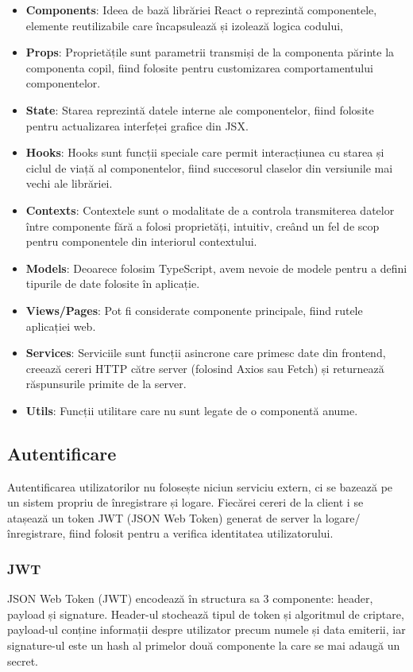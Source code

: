 \begin{itemize}
    \item \textbf{Components}: Ideea de bază librăriei React o reprezintă componentele, elemente
    reutilizabile care încapsulează și izolează logica codului,
    \item \textbf{Props}: Proprietățile sunt parametrii transmiși de la componenta părinte
    la componenta copil, fiind folosite pentru customizarea comportamentului componentelor.
    \item \textbf{State}: Starea reprezintă datele interne ale componentelor, fiind folosite pentru
    actualizarea interfeței grafice din JSX.
    \item \textbf{Hooks}: Hooks sunt funcții speciale care permit interacțiunea cu starea și ciclul
    de viață al componentelor, fiind succesorul claselor din versiunile mai vechi ale librăriei.
    \item \textbf{Contexts}: Contextele sunt o modalitate de a controla transmiterea datelor între
    componente fără a folosi proprietăți, intuitiv, creând un fel de scop pentru componentele din
    interiorul contextului.
    \item \textbf{Models}: Deoarece folosim TypeScript, avem nevoie de modele pentru a defini tipurile
    de date folosite în aplicație.
    \item \textbf{Views/Pages}: Pot fi considerate componente principale, fiind rutele aplicației web.
    \item \textbf{Services}: Serviciile sunt funcții asincrone care primesc date din frontend,
    creează cereri HTTP către server (folosind Axios sau Fetch) și returnează răspunsurile
    primite de la server.
    \item \textbf{Utils}: Funcții utilitare care nu sunt legate de o componentă anume.
\end{itemize}

\subsection{Autentificare}
Autentificarea utilizatorilor nu folosește niciun serviciu extern, ci se bazează pe un sistem
propriu de înregistrare și logare. Fiecărei cereri de la client i se atașează un token JWT
(JSON Web Token) generat de server la logare/înregistrare, fiind folosit pentru a verifica
identitatea utilizatorului. 

\subsubsection{JWT}
JSON Web Token (JWT) encodează în structura sa 3 componente: header, payload și signature.
Header-ul stochează tipul de token și algoritmul de criptare, payload-ul conține informații
despre utilizator precum numele și data emiterii, iar signature-ul este un hash al primelor
două componente la care se mai adaugă un secret.

